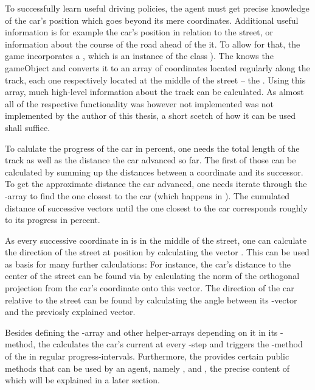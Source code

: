 To successfully learn useful driving policies, the agent must get precise knowledge of the car's position which goes beyond its mere coordinates. Additional useful information is for example the car's position in relation to the street, or information about the course of the road ahead of the it. To allow for that, the game incorporates a , which is an instance of the class ). The  knows the gameObject  and converts it to an array of coordinates located regularly along the track, each one respectively located at the middle of the street -- the . Using this array, much high-level information about the track can be calculated. As almost all of the respective functionality was however not implemented was not implemented by the author of this thesis, a short scetch of how it can be used shall suffice.

To calulate the progress of the car in percent, one needs the total length of the track as well as the distance the car advanced so far. The first of those can be calculated by summing up the distances between a coordinate and its successor. To get the approximate distance the car advanced, one needs iterate through the -array to find the one closest to the car (which happens in ). The cumulated distance of successive vectors until the one closest to the car corresponds roughly to its progress in percent. 

As every successive coordinate in  is in the middle of the street, one can calculate the direction of the street at position  by calculating the vector . This can be used as basis for many further calculations: For instance, the car's distance to the center of the street can be found via by calculating the norm of the orthogonal projection from the car's coordinate onto this vector. The direction of the car relative to the street can be found by calculating the angle between its -vector and the previosly explained vector.

Besides defining the -array and other helper-arrays depending on it in its -method, the  calculates the car's current  at every -step and triggers the -method of the  in regular progress-intervals. Furthermore, the  provides certain public methods that can be used by an agent, namely ,  and , the precise content of which will be explained in a later section.

